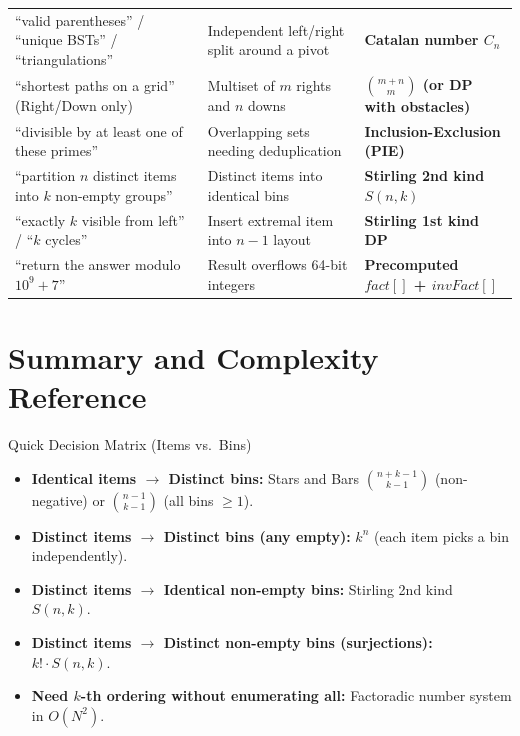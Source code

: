 \documentclass[11pt,a4paper]{article}
\theoremstyle{definition}
\begin{document}
\begin{xltabular}{\textwidth}{>{\raggedright\arraybackslash}p{4.4cm} >{\raggedright\arraybackslash}X >{\raggedright\arraybackslash\bfseries}p{4.1cm}}
``valid parentheses'' / ``unique BSTs'' / ``triangulations'' & Independent left/right split around a pivot & Catalan number $C_n$ \\
``shortest paths on a grid'' (Right/Down only) & Multiset of $m$ rights and $n$ downs & $\binom{m+n}{m}$ (or DP with obstacles) \\
``divisible by at least one of these primes'' & Overlapping sets needing deduplication & Inclusion-Exclusion (PIE) \\
``partition $n$ distinct items into $k$ non-empty groups'' & Distinct items into identical bins & Stirling 2nd kind $S(n, k)$ \\
``exactly $k$ visible from left'' / ``$k$ cycles'' & Insert extremal item into $n-1$ layout & Stirling 1st kind DP \\
``return the answer modulo $10^9 + 7$'' & Result overflows 64-bit integers & Precomputed $fact[]$ + $invFact[]$ \\
\end{xltabular}\endgroup

\section{Summary and Complexity Reference}

\begin{calloutbox}{Quick Decision Matrix (Items vs.\ Bins)}
\begin{itemize}
    \item \textbf{Identical items $\to$ Distinct bins:} Stars and Bars $\binom{n + k - 1}{k - 1}$ (non-negative) or $\binom{n - 1}{k - 1}$ (all bins $\ge 1$).
    \item \textbf{Distinct items $\to$ Distinct bins (any empty):} $k^n$ (each item picks a bin independently).
    \item \textbf{Distinct items $\to$ Identical non-empty bins:} Stirling 2nd kind $S(n, k)$.
    \item \textbf{Distinct items $\to$ Distinct non-empty bins (surjections):} $k! \cdot S(n, k)$.
    \item \textbf{Need $k$-th ordering without enumerating all:} Factoradic number system in $O(N^2)$.
\end{itemize}
\end{calloutbox}
\end{document}

